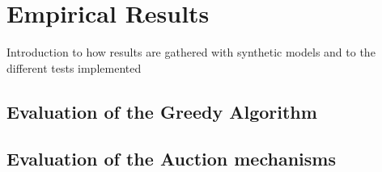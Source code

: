 \section{Empirical Results}\label{sec:empirical-results}
Introduction to how results are gathered with synthetic models and to the different tests implemented

\subsection{Evaluation of the Greedy Algorithm}\label{subsec:evaluation-of-the-greedy-algorithm}
%
\subsection{Evaluation of the Auction mechanisms}\label{subsec:evaluation-of-the-auction-mechanisms}

